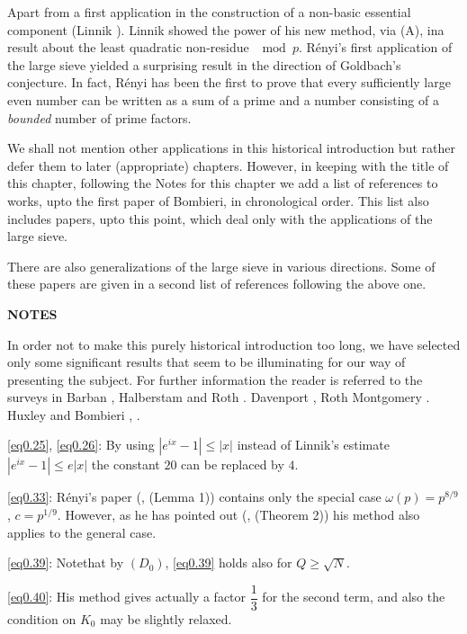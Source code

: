  Apart from a first application in the construction of a non-basic
 essential component (Linnik \cite{key2}). Linnik \cite{key3} showed
 the power of his new method, via (A), in\pageoriginale a result about
 the least quadratic non-residue $\mod p$. R\'enyi's  first
 application of the large sieve yielded a surprising result in the
 direction of Goldbach's conjecture. In fact,   R\'enyi has been the
 first to prove that every sufficiently large even number can be
 written as a sum of a prime  and a number consisting of a
 \textit{bounded} number of prime factors. 
  
We shall not mention other applications in this historical
introduction but rather defer them to later (appropriate)
chapters. However, in keeping with the title of this chapter,
following the Notes for  this chapter we add a list of references to
works, upto the first paper of Bombieri, in chronological
order. This list also includes papers, upto this point, which deal
only with the applications of the large sieve. 
  
There are also generalizations of the large sieve in  various
directions. Some of these papers are given  in a second list of
references following the above one. 

\medskip  
\begin{center}
\textbf{NOTES}
\end{center}  
  
In order not to make this purely historical introduction too long,  we
have selected only some significant results that seem to be
illuminating for our way of presenting the subject. For further
information the reader is referred to the surveys in Barban \cite{key10},
Halberstam and Roth \cite{key1}.  Davenport \cite{key1}, Roth
\cite{key4} Montgomery \cite{key5}. Huxley \cite{key7}  and Bombieri
\cite{key5}, \cite{key6}.  

\eqref{eq0.25}, \eqref{eq0.26}: By using $|e^{ix}-1|  \leq |x|$
instead of Linnik's estimate $|e^{ix}-1| \leq e |x|$ the constant $20$
can be replaced by $4$.
 
\eqref{eq0.33}: R\'enyi's paper (\cite{key2}, (Lemma 1)) contains
only the special case $ \omega (p)= p ^{8/9}$, $c=p^{1/9}$.  However,
as he has  pointed out   (\cite{key7},  (Theorem 2)) his method also
applies to the general case. 

\eqref{eq0.39}: Note\pageoriginale that by $(D_0)$, \eqref{eq0.39} holds
also for $Q\geq\sqrt{N}$.
 
\eqref{eq0.40}: His method gives actually a factor $\dfrac{1}{3}$ for
the second term, and also the condition on $K_0$ may be slightly
relaxed. 
 
